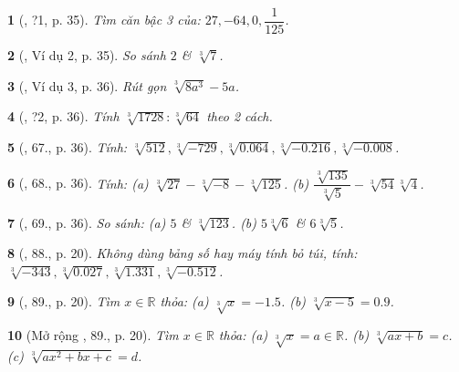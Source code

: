 \documentclass{article}
\newtheorem{baitoan}{}
\begin{document}
\begin{baitoan}[\cite{SGK_Toan_9_tap_1}, ?1, p. 35]
	Tìm căn bậc 3 của: $27,-64,0,\dfrac{1}{125}$.
\end{baitoan}

\begin{baitoan}[\cite{SGK_Toan_9_tap_1}, Ví dụ 2, p. 35]
	So sánh $2$ \& $\sqrt[3]{7}$.
\end{baitoan}

\begin{baitoan}[\cite{SGK_Toan_9_tap_1}, Ví dụ 3, p. 36]
	Rút gọn $\sqrt[3]{8a^3} - 5a$.
\end{baitoan}

\begin{baitoan}[\cite{SGK_Toan_9_tap_1}, ?2, p. 36]
	Tính $\sqrt[3]{1728}:\sqrt[3]{64}$ theo 2 cách.
\end{baitoan}

\begin{baitoan}[\cite{SGK_Toan_9_tap_1}, 67., p. 36]
	Tính: $\sqrt[3]{512},\sqrt[3]{-729},\sqrt[3]{0.064},\sqrt[3]{-0.216},\sqrt[3]{-0.008}$.
\end{baitoan}

\begin{baitoan}[\cite{SGK_Toan_9_tap_1}, 68., p. 36]
	Tính: (a) $\sqrt[3]{27} - \sqrt[3]{-8} - \sqrt[3]{125}$. (b) $\dfrac{\sqrt[3]{135}}{\sqrt[3]{5}} - \sqrt[3]{54}\sqrt[3]{4}$.
\end{baitoan}

\begin{baitoan}[\cite{SGK_Toan_9_tap_1}, 69., p. 36]
	So sánh: (a) $5$ \& $\sqrt[3]{123}$. (b) $5\sqrt[3]{6}$ \& $6\sqrt[3]{5}$.
\end{baitoan}

\begin{baitoan}[\cite{SBT_Toan_9_tap_1}, 88., p. 20]
	Không dùng bảng số hay máy tính bỏ túi, tính: $\sqrt[3]{-343},\sqrt[3]{0.027},\sqrt[3]{1.331},\sqrt[3]{-0.512}$.
\end{baitoan}

\begin{baitoan}[\cite{SBT_Toan_9_tap_1}, 89., p. 20]
	Tìm $x\in\mathbb{R}$ thỏa: (a) $\sqrt[3]{x} = -1.5$. (b) $\sqrt[3]{x - 5} = 0.9$.
\end{baitoan}

\begin{baitoan}[Mở rộng \cite{SBT_Toan_9_tap_1}, 89., p. 20]
	Tìm $x\in\mathbb{R}$ thỏa: (a) $\sqrt[3]{x} = a\in\mathbb{R}$. (b) $\sqrt[3]{ax + b} = c$. (c) $\sqrt[3]{ax^2 + bx + c} = d$.
\end{baitoan}
\end{document}
